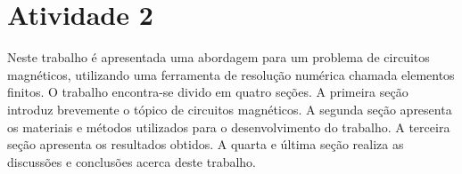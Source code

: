 \chapter{Atividade 2}
Neste trabalho é apresentada uma abordagem para um problema de circuitos magnéticos, utilizando uma ferramenta de resolução numérica chamada elementos finitos. O trabalho encontra-se divido em quatro seções. A primeira seção introduz brevemente o tópico de circuitos magnéticos. A segunda seção apresenta os materiais e métodos utilizados para o desenvolvimento do trabalho. A terceira seção apresenta os resultados obtidos. A quarta e última seção realiza as discussões e conclusões acerca deste trabalho.
\newpage
\pagebreak

\newpage
\pagebreak

\newpage
\pagebreak

\newpage
\pagebreak

